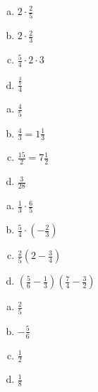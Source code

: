 \begin{multicols}{2}
        \begin{tehtava}
        
        \begin{enumerate}[a)]
        	\item $2 \cdot \frac{2}{5}$
        	\item $2 \cdot \frac{2}{3}$
        	\item $\frac{5}{4} \cdot 2 \cdot 3$
        	\item $\frac{\frac{3}{7}}{4}$ 
        \end{enumerate}
            \begin{vastaus}
        		\begin{enumerate}[a)]
        			\item $\frac{4}{5}$
        			\item $\frac{4}{3} = 1 \frac{1}{3}$
        			\item $\frac{15}{2} = 7 \frac{1}{2}$
        			\item $\frac{3}{28}$
        		\end{enumerate}
            \end{vastaus}
        \end{tehtava}
        
        \begin{tehtava}
        
        \begin{enumerate}[a)]
        	\item $\frac{1}{3} \cdot \frac{6}{5}$
        	\item $\frac{5}{4} \cdot (-\frac{2}{3})$ 
        	\item $\frac{2}{5} (2 - \frac{3}{4})$
        	\item $(\frac{5}{6} - \frac{1}{3})(\frac{7}{4} - \frac{3}{2})$
        \end{enumerate}
            \begin{vastaus}		
        		\begin{enumerate}[a)]
        			\item $\frac{2}{5}$
        			\item $-\frac{5}{6}$
        			\item $\frac{1}{2}$
        			\item $\frac{1}{8}$ 
        		\end{enumerate}
            \end{vastaus}
        \end{tehtava}
        
        \begin{tehtava} %
        

\end{tehtava}
\end{multicols}
